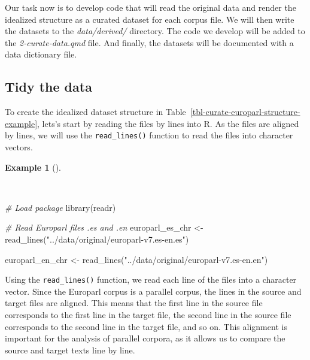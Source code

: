 \documentclass[
  letterpaper,
  krantz1]{latex/krantz-mod}
\newenvironment{Shaded}{\begin{snugshade}}{\end{snugshade}}
\newcommand{\CommentTok}[1]{\textcolor[rgb]{0.00,0.00,0.00}{\textit{#1}}}
\newcommand{\FunctionTok}[1]{\textcolor[rgb]{0.00,0.00,0.00}{#1}}
\newcommand{\NormalTok}[1]{\textcolor[rgb]{0.00,0.00,0.00}{#1}}
\newcommand{\OtherTok}[1]{\textcolor[rgb]{0.00,0.00,0.00}{#1}}
\newcommand{\StringTok}[1]{\textcolor[rgb]{0.00,0.00,0.00}{#1}}
\theoremstyle{definition}
\newtheorem{example}{Example}[chapter]
\theoremstyle{definition}
\theoremstyle{remark}
\begin{document}
Our task now is to develop code that will read the original data and
render the idealized structure as a curated dataset for each corpus
file. We will then write the datasets to the \emph{data/derived/}
directory. The code we develop will be added to the
\emph{2-curate-data.qmd} file. And finally, the datasets will be
documented with a data dictionary file.

\subsection{Tidy the data}\label{tidy-the-data}

To create the idealized dataset structure in
Table~\ref{tbl-curate-europarl-structure-example}, lets's start by
reading the files by lines into R. As the files are aligned by lines, we
will use the \texttt{read\_lines()} function to read the files into
character vectors.

\begin{example}[]\protect\hypertarget{exm-curate-europarl-readr}{}\label{exm-curate-europarl-readr}

~

\begin{Shaded}
\begin{Highlighting}[numbers=left,,]
\CommentTok{\# Load package}
\FunctionTok{library}\NormalTok{(readr)}

\CommentTok{\# Read Europarl files .es and .en}
\NormalTok{europarl\_es\_chr }\OtherTok{\textless{}{-}}
  \FunctionTok{read\_lines}\NormalTok{(}\StringTok{"../data/original/europarl{-}v7.es{-}en.es"}\NormalTok{)}

\NormalTok{europarl\_en\_chr }\OtherTok{\textless{}{-}}
  \FunctionTok{read\_lines}\NormalTok{(}\StringTok{"../data/original/europarl{-}v7.es{-}en.en"}\NormalTok{)}
\end{Highlighting}
\end{Shaded}

\end{example}

Using the \texttt{read\_lines()} function, we read each line of the
files into a character vector. Since the Europarl corpus is a parallel
corpus, the lines in the source and target files are aligned. This means
that the first line in the source file corresponds to the first line in
the target file, the second line in the source file corresponds to the
second line in the target file, and so on. This alignment is important
for the analysis of parallel corpora, as it allows us to compare the
source and target texts line by line.
\end{document}
